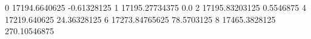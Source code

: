 0 17194.6640625 -0.61328125
1 17195.27734375 0.0
2 17195.83203125 0.5546875
4 17219.640625 24.36328125
6 17273.84765625 78.5703125
8 17465.3828125 270.10546875
